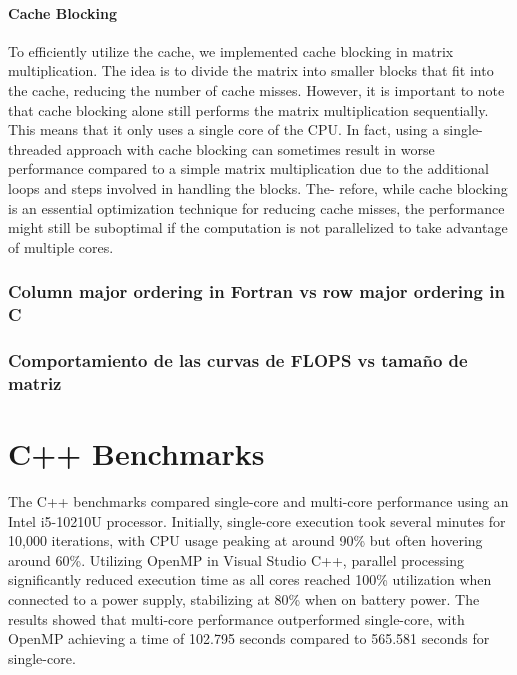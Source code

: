 \documentclass{article}
\begin{document}
    \paragraph{Cache Blocking}
    To efficiently utilize the cache, we implemented cache blocking in matrix multiplication. The idea is to divide the matrix into smaller blocks that fit into the cache, reducing the number of cache misses.
    However, it is important to note that cache blocking alone still performs the matrix multiplication sequentially. This means that it only uses a single core of the CPU. In fact, using a single-threaded approach with cache blocking can sometimes result in worse performance compared to a simple matrix multiplication due to the additional loops and steps involved in handling the blocks. The- refore, while cache blocking is an essential optimization technique for reducing cache misses, the performance might still be suboptimal if the computation is not parallelized to take advantage of multiple cores.


    \subsubsection{Column major ordering in Fortran vs row major ordering in C}


    \subsubsection{Comportamiento de las curvas de FLOPS vs tamaño de matriz}





\newpage
\section*{C++ Benchmarks}
The C++ benchmarks compared single-core and multi-core performance using an Intel i5-10210U processor. Initially, single-core execution took several minutes for 10,000 iterations, with CPU usage peaking at around 90\% but often hovering around 60\%. Utilizing OpenMP in Visual Studio C++, parallel processing significantly reduced execution time as all cores reached 100\% utilization when connected to a power supply, stabilizing at 80\% when on battery power. The results showed that multi-core performance outperformed single-core, with OpenMP achieving a time of 102.795 seconds compared to 565.581 seconds for single-core.
\end{document}
